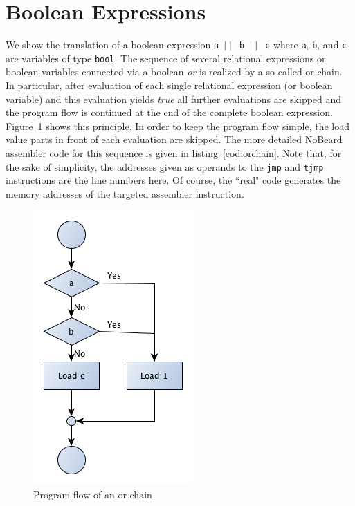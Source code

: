 \documentclass[11pt]{report}
\newcommand{\leongage}{NoBeard}
\begin{document}
\section{Boolean Expressions}
We show the translation of a boolean expression {\tt a $\mid \mid$ b $\mid \mid$ c} where {\tt a}, {\tt b}, and {\tt c} are variables of type {\tt bool}. The sequence of several relational expressions or boolean variables connected via a boolean {\em or} is realized by a so-called or-chain. In particular, after evaluation of each single relational expression (or boolean variable) and this evaluation yields {\em true} all further evaluations are skipped and the program flow is continued at the end of the complete boolean expression. Figure~\ref{fig:orchain} shows this principle. In order to keep the program flow simple, the load value parts in front of each evaluation are skipped. The more detailed \leongage{} assembler code for this sequence is given in listing~\ref{cod:orchain}. Note that, for the sake of simplicity, the addresses given as operands to the \lstinline$jmp$ and \lstinline{tjmp} instructions are the line numbers here. Of course, the ``real" code generates the memory addresses of the targeted assembler instruction.

\begin{figure}
\begin{center}
\includegraphics[scale=.5]{images/OrChain.png}
\end{center}
\caption{Program flow of an or chain}
\label{fig:orchain}
\end{figure}
\end{document}
